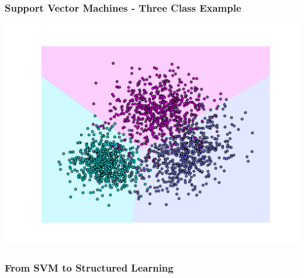 \begin{frame}
    \frametitle{Support Vector Machines - Three Class Example}
    \includegraphics[width=\textwidth]{images/three_class_svm.pdf}
\end{frame}

\begin{frame}
    \frametitle{From SVM to Structured Learning}
\end{frame}


